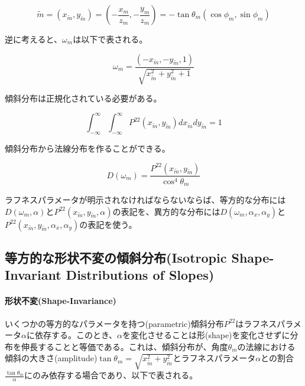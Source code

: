 \documentclass[a4j,xelatex,ja=standard]{bxjsarticle}
\begin{document}
\begin{equation}
    \tilde{m} = (x_{\tilde{m}}, y_{\tilde{m}}) = (-\frac{x_m}{z_m}, -\frac{y_m}{z_m}) = -\tan\theta_m(\cos\phi_m, \sin\phi_m)
    \label{eq:61}
\end{equation}

逆に考えると、$\omega_m$は以下で表される。

\begin{equation}
    \omega_m = \frac{(-x_{\tilde{m}}, -y_{\tilde{m}}, 1)}{\sqrt{x_{\tilde{m}}^2 + y_{\tilde{m}}^2 + 1}}
    \label{eq:62}
\end{equation}

傾斜分布は正規化されている必要がある。

\begin{equation}
    \int_{-\infty}^{\infty} \int_{-\infty}^{\infty} P^{22}(x_{\tilde{m}}, y_{\tilde{m}}) dx_{\tilde{m}} dy_{\tilde{m}} = 1
    \label{eq:63}
\end{equation}

傾斜分布から法線分布を作ることができる。

\begin{equation}
    D(\omega_m) = \frac{P^{22}(x_{\tilde{m}}, y_{\tilde{m}})}{\cos^{4} \theta_m}
    \label{eq:64}
\end{equation}

ラフネスパラメータが明示されなければならないならば、等方的な分布には$D(\omega_m, \alpha)$と$P^{22}(x_{\tilde{m}}, y_{\tilde{m}}, \alpha)$の表記を、異方的な分布には$D(\omega_m, \alpha_x, \alpha_y)$と$P^{22}(x_{\tilde{m}}, y_{\tilde{m}}, \alpha_x, \alpha_y)$の表記を使う。

\subsection{等方的な形状不変の傾斜分布(Isotropic Shape-Invariant Distributions of Slopes)}

\paragraph{形状不変(Shape-Invariance)}

いくつかの等方的なパラメータを持つ(parametric)傾斜分布$P^{22}$はラフネスパラメータ$\alpha$に依存する。このとき、$\alpha$を変化させることは形(shape)を変化させずに分布を伸長することと等価である。これは、傾斜分布が、角度$\theta_m$の法線における傾斜の大きさ(amplitude)$\tan\theta_m = \sqrt{x_{\tilde{m}}^2 + y_{\tilde{m}}^2}$とラフネスパラメータ$\alpha$との割合$\frac{\tan\theta_m}{\alpha}$にのみ依存する場合であり、以下で表される。
\end{document}
